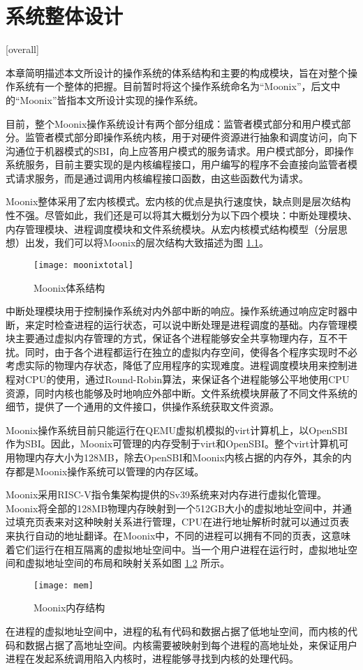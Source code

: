 
\chapter{系统整体设计}[overall]
\label{chapter:overall}

本章简明描述本文所设计的操作系统的体系结构和主要的构成模块，旨在对整个操作系统有一个整体的把握。目前暂时将这个操作系统命名为“Moonix”，后文中的“Moonix”皆指本文所设计实现的操作系统。

目前，整个Moonix操作系统设计有两个部分组成：监管者模式部分和用户模式部分。监管者模式部分即操作系统内核，用于对硬件资源进行抽象和调度访问，向下沟通位于机器模式的SBI，向上应答用户模式的服务请求。用户模式部分，即操作系统服务，目前主要实现的是内核编程接口，用户编写的程序不会直接向监管者模式请求服务，而是通过调用内核编程接口函数，由这些函数代为请求。

Moonix整体采用了宏内核模式。宏内核的优点是执行速度快，缺点则是层次结构性不强。尽管如此，我们还是可以将其大概划分为以下四个模块：中断处理模块、内存管理模块、进程调度模块和文件系统模块。从宏内核模式结构模型（分层思想）出发，我们可以将Moonix的层次结构大致描述为图 \ref{pic:moonixtotal}。

\begin{figure}[htpb]
	\centering
	\texttt{[image: moonixtotal]}
	\setlength{\abovecaptionskip}{2pt}
	\caption{Moonix体系结构}
	\label{pic:moonixtotal}
\end{figure}

中断处理模块用于控制操作系统对内外部中断的响应。操作系统通过响应定时器中断，来定时检查进程的运行状态，可以说中断处理是进程调度的基础。内存管理模块主要通过虚拟内存管理的方式，保证各个进程能够安全共享物理内存，互不干扰。同时，由于各个进程都运行在独立的虚拟内存空间，使得各个程序实现时不必考虑实际的物理内存状态，降低了应用程序的实现难度。进程调度模块用来控制进程对CPU的使用，通过Round-Robin算法\cite{DBLP:journals/eor/RasmussenT08}，来保证各个进程能够公平地使用CPU资源，同时内核也能够及时地响应外部中断。文件系统模块屏蔽了不同文件系统的细节，提供了一个通用的文件接口，供操作系统获取文件资源。

Moonix操作系统目前只能运行在QEMU虚拟机模拟的virt计算机上，以OpenSBI作为SBI。因此，Moonix可管理的内存受制于virt和OpenSBI。整个virt计算机可用物理内存大小为128MB，除去OpenSBI和Moonix内核占据的内存外，其余的内存都是Moonix操作系统可以管理的内存区域。

Moonix采用RISC-V指令集架构提供的Sv39系统来对内存进行虚拟化管理。Moonix将全部的128MB物理内存映射到一个512GB大小的虚拟地址空间中，并通过填充页表来对这种映射关系进行管理，CPU在进行地址解析时就可以通过页表来执行自动的地址翻译。在Moonix中，不同的进程可以拥有不同的页表，这意味着它们运行在相互隔离的虚拟地址空间中。当一个用户进程在运行时，虚拟地址空间和虚拟地址空间的布局和映射关系如图 \ref{pic:moonixmem} 所示。

\begin{figure}[htpb]
	\centering
	\texttt{[image: mem]}
	\setlength{\abovecaptionskip}{2pt}
	\caption{Moonix内存结构}
	\label{pic:moonixmem}
\end{figure}

在进程的虚拟地址空间中，进程的私有代码和数据占据了低地址空间，而内核的代码和数据占据了高地址空间。内核需要被映射到每个进程的高地址处，来保证用户进程在发起系统调用陷入内核时，进程能够寻找到内核的处理代码。